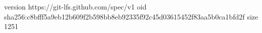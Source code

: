 version https://git-lfs.github.com/spec/v1
oid sha256:c8bfff5a9eb12b609f2b598bb8eb92335f92c45d03615452f83aa5b0ca1bfd2f
size 1251
